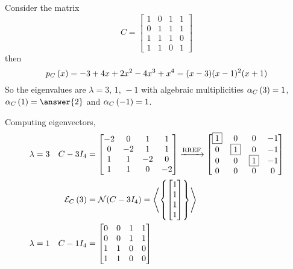 \documentclass{ximera}
\begin{document}
\begin{example}
  Consider the matrix
  \[
    C=
    \begin{bmatrix}
      1 &  0 &  1 &  1\\
      0 &  1 &  1 &  1\\
      1 &  1 &  1 &  0\\
      1 &  1 &  0 &  1
    \end{bmatrix}
  \]
  then
  \[
    p_{C}\left(x\right)=-3+4x+2x^2-4x^3+x^4=(x-3)(x-1)^2(x+1)
  \]
  So the eigenvalues are $\lambda=3,\,1,\,-1$ with algebraic
  multiplicities $\alpha_{C}\left(3\right)=1$, $\algmult{C}{1}=\answer{2}$ and
  $\alpha_{C}\left(-1\right)=1$.

  Computing eigenvectors,
  \begin{align*}
    \lambda&=3&C- 3I_4&=
                        \begin{bmatrix}
                          -2 & 0 & 1 & 1\\
                          0 & -2 & 1 & 1\\
                          1 & 1 & -2 & 0\\
                          1 & 1 & 0 & -2
                        \end{bmatrix}
                                      \xrightarrow{\text{RREF}}
                                      \begin{bmatrix}
                                        \fbox{1} & 0 & 0 & -1\\
                                        0 & \fbox{1} & 0 & -1\\
                                        0 & 0 & \fbox{1} & -1\\
                                        0 & 0 & 0 & 0
                                      \end{bmatrix}\\
           &&\mathcal{E}_{C}\left(3\right)&=\mathcal{N}\!\left(C-3I_4\right)
                                =\left\langle\left\{\begin{bmatrix}1\\1\\1\\1\end{bmatrix}\right\}\right\rangle\\
    \lambda&=1&C-1I_4&=
                       \begin{bmatrix}
                         0 & 0 & 1 & 1\\
                         0 & 0 & 1 & 1\\
                         1 & 1 & 0 & 0\\
                         1 & 1 & 0 & 0

\end{bmatrix}
\end{align*}
\end{example}
\end{document}
